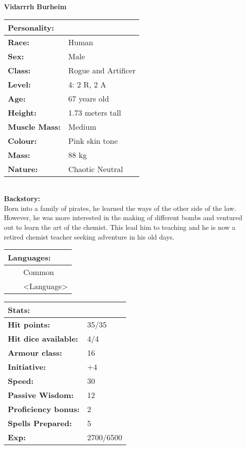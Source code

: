 \documentclass[11pt]{article}
\newcommand{\tabitem}{~~\llap{--}~~}
\begin{document}
	\begin{center}
\Huge \textbf{Vidarrrh Burheim}
	\end{center}
	\begin{multicols}{2}
\noindent \begin{tabularx}{95mm}{@{}l l}
\Large \textbf{Personality:} 	& 						\\
\hline
\textbf{Race:} 					& Human	 				\\
\textbf{Sex:} 					& Male 					\\
\textbf{Class:}					& Rogue and Artificer	\\
\textbf{Level:} 				& 4: 2 R, 2 A			\\
\textbf{Age:} 					& 67 years old			\\
\textbf{Height:} 				& 1.73 meters tall 		\\
\textbf{Muscle Mass:} 			& Medium 				\\
\textbf{Colour:} 				& Pink skin tone	 	\\
\textbf{Mass:} 					& 88 kg			 		\\
\textbf{Nature:} 				& Chaotic Neutral
		\end{tabularx} \\
\textbf{Backstory:} \\
Born into a family of pirates, he learned the ways of the other side of the law. However, he was more interested in the making of different bombs and ventured out to learn the art of the chemist. This lead him to teaching and he is now a retired chemist teacher seeking adventure in his old days.

\noindent \begin{tabularx}{95mm}{@{}l}
{\Large \textbf{Languages:}} \\
\hline
\tabitem Common \\
\tabitem <Language>
		\end{tabularx}

\vspace{4mm}

\noindent \begin{tabularx}{95mm}{@{}l l}
\Large \textbf{Stats:}		 	& 									\\
\hline
\textbf{Hit points:} 			& 35/35 							\\
\textbf{Hit dice available:}	& 4/4								\\
\textbf{Armour class:} 			& 16							 	\\
\textbf{Initiative:} 			& +4								\\
\textbf{Speed:} 				& 30		 						\\
\textbf{Passive Wisdom:} 		& 12	 							\\
\textbf{Proficiency bonus:}		& 2									\\
\textbf{Spells Prepared:} 		& 5									\\
\textbf{Exp:} 					& 2700/6500
		\end{tabularx}


\end{multicols}
\end{document}
